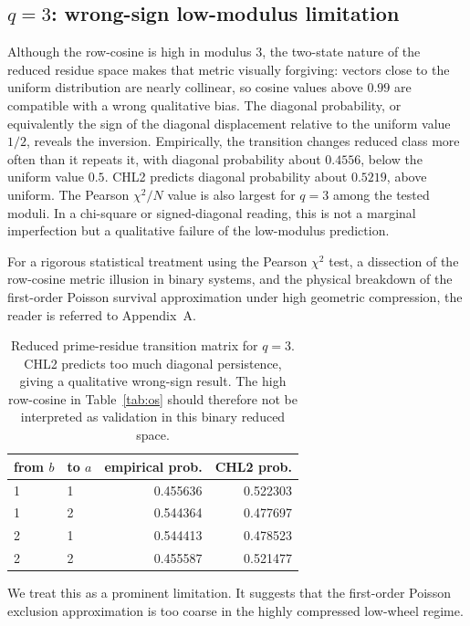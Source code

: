 \documentclass[10pt]{article}
\begin{document}
\subsection{$q=3$: wrong-sign low-modulus limitation}
Although the row-cosine is high in modulus $3$, the two-state nature of the reduced residue space makes that metric visually forgiving: vectors close to the uniform distribution are nearly collinear, so cosine values above $0.99$ are compatible with a wrong qualitative bias. The diagonal probability, or equivalently the sign of the diagonal displacement relative to the uniform value $1/2$, reveals the inversion. Empirically, the transition changes reduced class more often than it repeats it, with diagonal probability about $0.4556$, below the uniform value $0.5$. CHL2 predicts diagonal probability about $0.5219$, above uniform. The Pearson $\chi^2/N$ value is also largest for $q=3$ among the tested moduli. In a chi-square or signed-diagonal reading, this is not a marginal imperfection but a qualitative failure of the low-modulus prediction.

For a rigorous statistical treatment using the Pearson $\chi^2$ test, a dissection of the row-cosine metric illusion in binary systems, and the physical breakdown of the first-order Poisson survival approximation under high geometric compression, the reader is referred to Appendix~A.
\begin{table}[H]\centering\small
\begin{tabular}{llrr}
\toprule
from $b$ & to $a$ & empirical prob. & CHL2 prob. \\
\midrule
1 & 1 & 0.455636 & 0.522303 \\
1 & 2 & 0.544364 & 0.477697 \\
2 & 1 & 0.544413 & 0.478523 \\
2 & 2 & 0.455587 & 0.521477 \\
\bottomrule
\end{tabular}
\caption{Reduced prime-residue transition matrix for $q=3$. CHL2 predicts too much diagonal persistence, giving a qualitative wrong-sign result. The high row-cosine in Table~\ref{tab:os} should therefore not be interpreted as validation in this binary reduced space.}\label{tab:q3matrix}\end{table}
We treat this as a prominent limitation. It suggests that the first-order Poisson exclusion approximation is too coarse in the highly compressed low-wheel regime.
\end{document}
